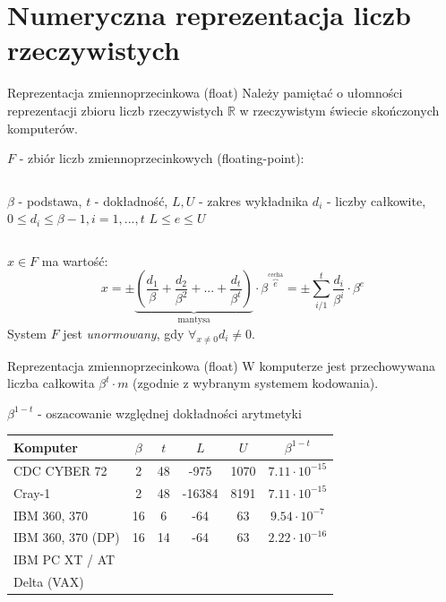 	\section{Numeryczna reprezentacja liczb rzeczywistych}
	\begin{frame}{Reprezentacja zmiennoprzecinkowa (float)}
    	Należy pamiętać o ułomności reprezentacji zbioru liczb rzeczywistych $\mathbb{R}$ w rzeczywistym świecie skończonych komputerów.
        \begin{block}{}
        $F$ - zbiór liczb zmiennoprzecinkowych (floating-point):\newline
        \begin{columns}
                $\beta$ - podstawa,\newline
                $t$ - dokładność,\newline
                $L, U$ - zakres wykładnika\newline
            	$d_i$ - liczby całkowite,
                $0 \le d_i \le \beta - 1, i=1,...,t$
                $L \le e \le U$
        \end{columns}
        $x \in F$ ma wartość:
        \[
        x = \pm \underbrace{\left(\frac{d_1}{\beta} + \frac{d_2}{\beta^2} + ... + \frac{d_t}{\beta^t}\right)}_\text{mantysa} \cdot \beta^{\overbrace{e}^\text{cecha}}
        = \pm \sum_{i/1}^{t} \frac{d_i}{\beta^i} \cdot \beta^e
        \]        
		System $F$ jest {\it unormowany}, gdy $\forall_{x \ne 0} d_i \ne 0$.
        \end{block}
        
	\end{frame}
	\begin{frame}{Reprezentacja zmiennoprzecinkowa (float)}
        W komputerze jest przechowywana liczba całkowita $\beta^t \cdot m$ (zgodnie z wybranym systemem kodowania).
        
        $\beta^{1-t}$ - oszacowanie względnej dokładności arytmetyki
        
        \hspace{0.5cm}
        \centering
        \begin{tabular}{| l | c | c | c | c | c |}
        \hline
        Komputer & $\beta$ & $t$ & $L$ & $U$ & $\beta^{1-t}$ \\ \hline
        CDC CYBER 72 		& 2  & 48 & -975 	& 1070 & $7.11 \cdot 10^{-15}$ \\ \hline
        Cray-1 				& 2  & 48 & -16384	& 8191 & $7.11 \cdot 10^{-15}$ \\ \hline
        IBM 360, 370 		& 16 & 6  & -64		& 63   & $9.54 \cdot 10^{-7}$ \\ \hline
        IBM 360, 370 (DP) 	& 16 & 14 & -64 	& 63   & $2.22 \cdot 10^{-16}$ \\ \hline
        IBM PC XT / AT 		& & & & & \\ \hline
        Delta (VAX) 		& & & & & \\ \hline
        \end{tabular}
 	\end{frame}

